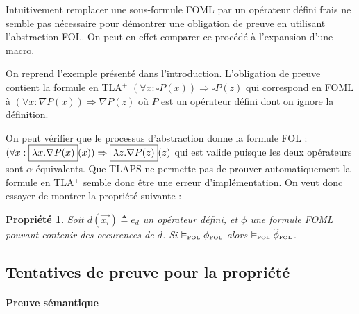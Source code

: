\documentclass[12pt]{article}
\newcommand{\FOL}{\ensuremath{\textup{\tiny{}FOL}}}
\newcommand{\bpar}[1]{\marginpar{\color{myblue}\footnotesize\raggedright#1}}
\newtheorem{prop}{Propriété}
\begin{document}
Intuitivement remplacer une sous-formule FOML par un opérateur défini frais ne semble pas nécessaire pour démontrer une obligation de preuve en utilisant l'abstraction FOL.
On peut en effet comparer ce procédé à l'expansion d'une macro.

On reprend l'exemple présenté dans l'introduction.
L'obligation de preuve contient la formule en TLA$^+$ \bpar{dire que $z$ est rigide} $(\forall x : \square P(x)) \Rightarrow \square P(z)$ qui correspond en FOML à $(\forall x : \nabla P(x)) \Rightarrow \nabla P(z)$ où $P$ est un opérateur défini dont on ignore la définition.

On peut vérifier que le processus d'abstraction donne la formule FOL :
\( (\forall x : \fbox{$\lambda x . \nabla P(x)$}(x)) \Rightarrow \fbox{$\lambda z . \nabla P(z)$}(z) \)
qui est valide puisque les deux opérateurs sont $\alpha$-équivalents.
Que TLAPS ne permette pas de prouver automatiquement la formule en TLA$^+$ semble donc être une erreur d'implémentation.
On veut donc essayer de montrer la propriété suivante :

\begin{prop}
  \label{prop_sem}
Soit $d(\vec{x_i}) \triangleq e_d$ un opérateur défini, et $\phi$ une formule FOML pouvant contenir des occurences de $d$.
Si $\vDash_\FOL \phi_\FOL$ alors $\vDash_\FOL \widetilde{\phi}_\FOL$.
\end{prop}

\subsection{Tentatives de preuve pour la propriété}

\paragraph{Preuve sémantique}
\end{document}

